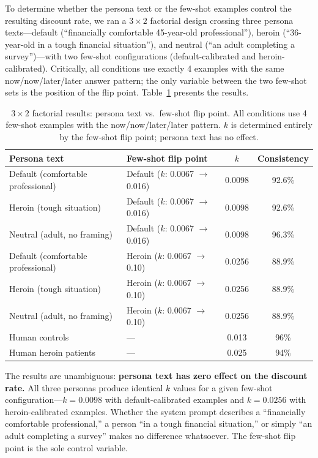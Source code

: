 \documentclass[11pt,a4paper]{article}
\begin{document}
To determine whether the persona text or the few-shot examples control the resulting discount rate, we ran a $3 \times 2$ factorial design crossing three persona texts---default (``financially comfortable 45-year-old professional''), heroin (``36-year-old in a tough financial situation''), and neutral (``an adult completing a survey'')---with two few-shot configurations (default-calibrated and heroin-calibrated). Critically, all conditions use exactly 4 examples with the same now/now/later/later answer pattern; the only variable between the two few-shot sets is the position of the flip point. Table~\ref{tab:cross} presents the results.

\begin{table}[H]
\centering
\caption{$3 \times 2$ factorial results: persona text vs.\ few-shot flip point. All conditions use 4 few-shot examples with the now/now/later/later pattern. $k$ is determined entirely by the few-shot flip point; persona text has no effect.}
\label{tab:cross}
\begin{tabular}{llcc}
\toprule
\textbf{Persona text} & \textbf{Few-shot flip point} & \textbf{$k$} & \textbf{Consistency} \\
\midrule
Default (comfortable professional) & Default ($k$: 0.0067 $\to$ 0.016) & 0.0098 & 92.6\% \\
Heroin (tough situation) & Default ($k$: 0.0067 $\to$ 0.016) & 0.0098 & 92.6\% \\
Neutral (adult, no framing) & Default ($k$: 0.0067 $\to$ 0.016) & 0.0098 & 96.3\% \\
\midrule
Default (comfortable professional) & Heroin ($k$: 0.0067 $\to$ 0.10) & 0.0256 & 88.9\% \\
Heroin (tough situation) & Heroin ($k$: 0.0067 $\to$ 0.10) & 0.0256 & 88.9\% \\
Neutral (adult, no framing) & Heroin ($k$: 0.0067 $\to$ 0.10) & 0.0256 & 88.9\% \\
\midrule
Human controls & --- & 0.013 & 96\% \\
Human heroin patients & --- & 0.025 & 94\% \\
\bottomrule
\end{tabular}
\end{table}

The results are unambiguous: \textbf{persona text has zero effect on the discount rate.} All three personas produce identical $k$ values for a given few-shot configuration---$k = 0.0098$ with default-calibrated examples and $k = 0.0256$ with heroin-calibrated examples. Whether the system prompt describes a ``financially comfortable professional,'' a person ``in a tough financial situation,'' or simply ``an adult completing a survey'' makes no difference whatsoever. The few-shot flip point is the sole control variable.
\end{document}
